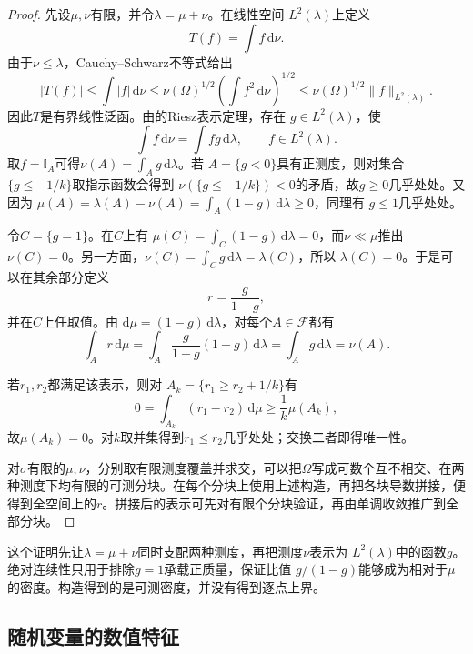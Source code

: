 \begin{proof}
先设\(\mu,\nu\)有限，并令\(\lambda=\mu+\nu\)。在线性空间
\(L^2(\lambda)\)上定义
\[
  T(f)=\int f\,\mathrm{d}\nu.
\]
由于\(\nu\leq\lambda\)，Cauchy--Schwarz不等式给出
\[
  |T(f)|
  \leq\int|f|\,\mathrm{d}\nu
  \leq\nu(\Omega)^{1/2}
       \left(\int f^2\,\mathrm{d}\nu\right)^{1/2}
  \leq\nu(\Omega)^{1/2}\lVert f\rVert_{L^2(\lambda)}.
\]
因此\(T\)是有界线性泛函。由的Riesz表示定理，存在
\(g\in L^2(\lambda)\)，使
\[
  \int f\,\mathrm{d}\nu=\int fg\,\mathrm{d}\lambda,
  \qquad f\in L^2(\lambda).
\]
取\(f=\mathbb{I}_A\)可得\(\nu(A)=\int_Ag\,\mathrm{d}\lambda\)。若
\(A=\{g<0\}\)具有正测度，则对集合\(\{g\leq-1/k\}\)取指示函数会得到
\(\nu(\{g\leq-1/k\})<0\)的矛盾，故\(g\geq0\)几乎处处。又因为
\(\mu(A)=\lambda(A)-\nu(A)=\int_A(1-g)\,\mathrm{d}\lambda\geq0\)，同理有
\(g\leq1\)几乎处处。

令\(C=\{g=1\}\)。在\(C\)上有
\(\mu(C)=\int_C(1-g)\,\mathrm{d}\lambda=0\)，而\(\nu\ll\mu\)推出
\(\nu(C)=0\)。另一方面，\(\nu(C)=\int_Cg\,\mathrm{d}\lambda=\lambda(C)\)，所以
\(\lambda(C)=0\)。于是可以在其余部分定义
\[
  r=\frac{g}{1-g},
\]
并在\(C\)上任取值。由
\(\mathrm{d}\mu=(1-g)\,\mathrm{d}\lambda\)，对每个\(A\in\mathcal{F}\)都有
\[
  \int_A r\,\mathrm{d}\mu
  =\int_A\frac{g}{1-g}(1-g)\,\mathrm{d}\lambda
  =\int_Ag\,\mathrm{d}\lambda
  =\nu(A).
\]

若\(r_1,r_2\)都满足该表示，则对
\(A_k=\{r_1\geq r_2+1/k\}\)有
\[
  0=\int_{A_k}(r_1-r_2)\,\mathrm{d}\mu
  \geq\frac{1}{k}\mu(A_k),
\]
故\(\mu(A_k)=0\)。对\(k\)取并集得到\(r_1\leq r_2\)几乎处处；交换二者即得唯一性。

对\(\sigma\)有限的\(\mu,\nu\)，分别取有限测度覆盖并求交，可以把\(\Omega\)写成可数个互不相交、在两种测度下均有限的可测分块。在每个分块上使用上述构造，再把各块导数拼接，便得到全空间上的\(r\)。拼接后的表示可先对有限个分块验证，再由单调收敛推广到全部分块。
\end{proof}

这个证明先让\(\lambda=\mu+\nu\)同时支配两种测度，再把测度\(\nu\)表示为
\(L^2(\lambda)\)中的函数\(g\)。绝对连续性只用于排除\(g=1\)承载正质量，保证比值
\(g/(1-g)\)能够成为相对于\(\mu\)的密度。构造得到的是可测密度，并没有得到逐点上界。

\subsection{随机变量的数值特征}
\label{sec:rv-features}


